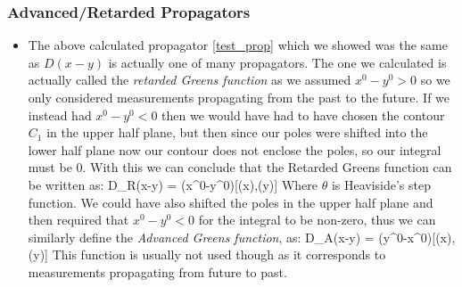 \documentclass[11pt]{article}
\renewenvironment{flalign}{\vspace{-3mm}\empheq[box=\tcbhighmath]{align}}{\endempheq}
\numberwithin{equation}{section}
\begin{document}
\subsubsection{Advanced/Retarded Propagators}
\begin{itemize}
  \item The above calculated propagator \ref{test_prop} which we showed was the same as $D(x-y)$ is actually one of many propagators. The one we calculated is actually called the \emph{retarded Greens function} as we assumed $x^{0}-y^{0}>0$ so we only considered measurements propagating from the past to the future. If we instead had $x^{0}-y^{0}<0$ then we would have had to have chosen the contour $C_1$ in the upper half plane, but then since our poles were shifted into the lower half plane now our contour does not enclose the poles, so our integral must be $0$. With this we can conclude that the Retarded Greens function can be written as:
  \begin{flalign}
  \label{retard}
    D_{R}(x-y) = \theta(x^{0}-y^{0})[\phi(x),\phi(y)]
  \end{flalign}
  Where $\theta$ is Heaviside's step function. We could have also shifted the poles in the upper half plane and then required that $x^{0}-y^{0}<0$ for the integral to be non-zero, thus we can similarly define the \emph{Advanced Greens function}, as:
    \begin{flalign}
    \label{advanced}
    D_{A}(x-y) = \theta(y^{0}-x^{0})[\phi(x),\phi(y)]
  \end{flalign} 
  This function is usually not used though as it corresponds to measurements propagating from future to past. 
\end{itemize}
\end{document}
